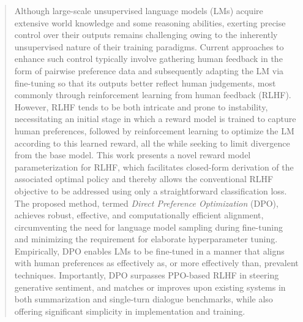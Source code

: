 \begin{abstract}
Although large-scale unsupervised language models (LMs) acquire extensive world knowledge and some reasoning abilities, exerting precise control over their outputs remains challenging owing to the inherently unsupervised nature of their training paradigms. Current approaches to enhance such control typically involve gathering human feedback in the form of pairwise preference data and subsequently adapting the LM via fine-tuning so that its outputs better reflect human judgements, most commonly through reinforcement learning from human feedback (RLHF). However, RLHF tends to be both intricate and prone to instability, necessitating an initial stage in which a reward model is trained to capture human preferences, followed by reinforcement learning to optimize the LM according to this learned reward, all the while seeking to limit divergence from the base model. This work presents a novel reward model parameterization for RLHF, which facilitates closed-form derivation of the associated optimal policy and thereby allows the conventional RLHF objective to be addressed using only a straightforward classification loss. The proposed method, termed \textit{Direct Preference Optimization} (DPO), achieves robust, effective, and computationally efficient alignment, circumventing the need for language model sampling during fine-tuning and minimizing the requirement for elaborate hyperparameter tuning. Empirically, DPO enables LMs to be fine-tuned in a manner that aligns with human preferences as effectively as, or more effectively than, prevalent techniques. Importantly, DPO surpasses PPO-based RLHF in steering generative sentiment, and matches or improves upon existing systems in both summarization and single-turn dialogue benchmarks, while also offering significant simplicity in implementation and training.
\end{abstract}

